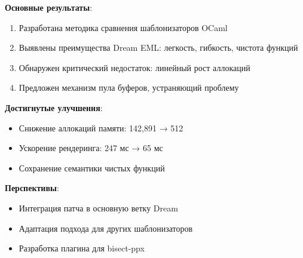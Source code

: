 \textbf{Основные результаты}:
\begin{enumerate}
    \item Разработана методика сравнения шаблонизаторов OCaml
    \item Выявлены преимущества Dream EML: легкость, гибкость, чистота функций
    \item Обнаружен критический недостаток: линейный рост аллокаций
    \item Предложен механизм пула буферов, устраняющий проблему
\end{enumerate}

\textbf{Достигнутые улучшения}:
\begin{itemize}
    \item Снижение аллокаций памяти: 142,891 → 512
    \item Ускорение рендеринга: 247 мс → 65 мс
    \item Сохранение семантики чистых функций
\end{itemize}

\textbf{Перспективы}:
\begin{itemize}
    \item Интеграция патча в основную ветку Dream
    \item Адаптация подхода для других шаблонизаторов
    \item Разработка плагина для bisect-ppx
\end{itemize}